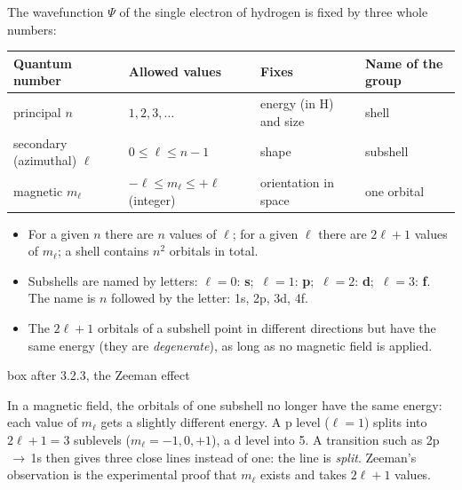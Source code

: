 The wavefunction $\Psi$ of the single electron of hydrogen is fixed by three whole numbers:
\begin{center}
\renewcommand{\arraystretch}{1.35}
\begin{tabular}{@{}l l l l@{}}
\toprule
Quantum number & Allowed values & Fixes & Name of the group\\ \midrule
principal $n$ & $1, 2, 3, \dots$ & energy (in H) and size & shell\\
secondary (azimuthal) $\ell$ & $0 \le \ell \le n-1$ & shape & subshell\\
magnetic $m_\ell$ & $-\ell \le m_\ell \le +\ell$ (integer) & orientation in space & one orbital\\ \bottomrule
\end{tabular}
\end{center}
\begin{itemize}
  \item For a given $n$ there are $n$ values of $\ell$; for a given $\ell$ there are $2\ell+1$ values
        of $m_\ell$; a shell contains $n^2$ orbitals in total.
  \item Subshells are named by letters: $\ell = 0$: \textbf{s};\ $\ell = 1$: \textbf{p};\ $\ell = 2$:
        \textbf{d};\ $\ell = 3$: \textbf{f}. The name is $n$ followed by the letter: 1s, 2p, 3d, 4f.
  \item The $2\ell+1$ orbitals of a subshell point in different directions but have the same energy
        (they are \emph{degenerate}), as long as no magnetic field is applied.
\end{itemize}
\begin{handout}{box after 3.2.3, the Zeeman effect}
\begin{minipage}{0.55\linewidth}\small
In a magnetic field, the orbitals of one subshell no longer have the same energy: each value of
$m_\ell$ gets a slightly different energy. A p level ($\ell = 1$) splits into $2\ell+1 = 3$ sublevels
($m_\ell = -1, 0, +1$), a d level into 5. A transition such as 2p$\,\to\,$1s then gives three close lines
instead of one: the line is \emph{split}. Zeeman's observation is the experimental proof that
$m_\ell$ exists and takes $2\ell+1$ values.
\end{minipage}\hfill
\begin{minipage}{0.4\linewidth}\centering
{}
\end{minipage}
\end{handout}

